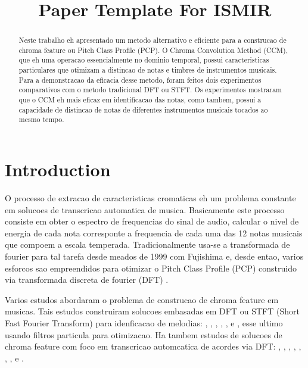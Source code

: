 \documentclass{article}
\title{Paper Template For ISMIR \conferenceyear}
\begin{document}
%
\maketitle
%
\begin{abstract}

Neste trabalho eh apresentado um metodo alternativo e eficiente para a construcao de chroma feature ou Pitch Class Profile (PCP). O Chroma Convolution Method (CCM), que eh uma operacao essencialmente no dominio temporal, possui caracteristicas particulares que otimizam a distincao de notas e timbres de instrumentos musicais. Para a demonstracao da eficacia desse metodo, foram feitos dois experimentos comparativos com o metodo tradicional DFT ou STFT. Os experimentos mostraram que o CCM eh mais eficaz em identificacao das notas, como tambem, possui a capacidade de distincao de notas de diferentes instrumentos musicais tocados ao mesmo tempo.  

\end{abstract}
%
\section{Introduction}\label{sec:introduction}


	O processo de extracao de caracteristicas cromaticas eh um problema constante em solucoes de transcricao automatica de musica. Basicamente este processo consiste em obter o espectro de frequencias do sinal de audio, calcular o nivel de energia de cada nota corresponte a frequencia de cada uma das 12 notas musicais que compoem a escala temperada. Tradicionalmente usa-se a transformada de fourier para tal tarefa desde meados de 1999 com Fujishima \cite{fujishima1999realtime} e, desde entao, varios esforcos sao empreendidos para otimizar o Pitch Class Profile (PCP) construido via transformada discreta de fourier (DFT) .

	Varios estudos abordaram o problema de construcao de chroma feature em musicas. Tais estudos construiram solucoes embasadas em DFT ou STFT (Short Fast Fourier Transform) para idenficacao de melodias: \cite{muto2002transcription}, \cite{al2008time}, \cite{barbancho2009transcription}, \cite{gomez2004automatic}, \cite{tangmelody}, \cite{eggink2004extracting} e \cite{jo2010melody}, esse ultimo usando filtros particula para otimizacao. Ha tambem estudos de solucoes de chroma feature com foco em transcricao automcatica de acordes via DFT:
	\cite{harte2009automatic}, \cite{khadkevich2011time}, \cite{harte2010towards}, \cite{peeters2006chroma}, \cite{cho2010exploring} \cite{lee2006automatic}, \cite{de2012improving}, \cite{boulanger2013audio}, \cite{chen2012chord} e \cite{hrybyk2010combined}.
\end{document}
